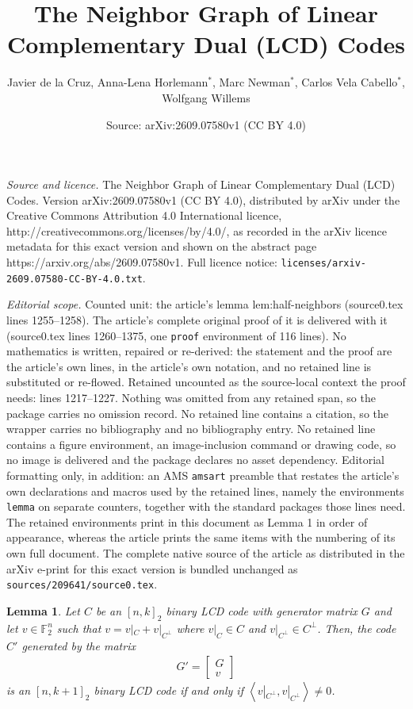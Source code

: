\documentclass[10pt,a4paper]{amsart}
\title{The Neighbor Graph of Linear Complementary Dual (LCD) Codes}
\author{Javier de la Cruz, Anna-Lena Horlemann$^*$, Marc Newman$^*$, Carlos Vela Cabello$^*$, Wolfgang Willems}
\date{Source: arXiv:2609.07580v1 (CC BY 4.0)}
\newtheorem{lemma}{Lemma}
\newcommand{\Ang}[1]{\left\langle#1\right\rangle}
\newcommand{\F}{\mathbb{F}}
\begin{document}
\maketitle

\noindent\emph{Source and licence.} The Neighbor Graph of Linear Complementary Dual (LCD) Codes. Version arXiv:2609.07580v1 (CC BY 4.0), distributed by arXiv under the Creative Commons Attribution 4.0 International licence, http://creativecommons.org/licenses/by/4.0/, as recorded in the arXiv licence metadata for this exact version and shown on the abstract page https://arxiv.org/abs/2609.07580v1. Full licence notice: \texttt{licenses/arxiv-2609.07580-CC-BY-4.0.txt}.\par\smallskip

\noindent\textit{Editorial scope.} Counted unit: the article's lemma lem:half-neighbors (source0.tex lines 1255--1258). The article's complete original proof of it is delivered with it (source0.tex lines 1260--1375, one \texttt{proof} environment of 116 lines). No mathematics is written, repaired or re-derived: the statement and the proof are the article's own lines, in the article's own notation, and no retained line is substituted or re-flowed.  Retained uncounted as the source-local context the proof needs: lines 1217--1227.  Nothing was omitted from any retained span, so the package carries no omission record.  No retained line contains a citation, so the wrapper carries no bibliography and no bibliography entry.  No retained line contains a figure environment, an image-inclusion command or drawing code, so no image is delivered and the package declares no asset dependency.  Editorial formatting only, in addition: an AMS \texttt{amsart} preamble that restates the article's own declarations and macros used by the retained lines, namely the environments \texttt{lemma} on separate counters, together with the standard packages those lines need.  The retained environments print in this document as Lemma 1 in order of appearance, whereas the article prints the same items with the numbering of its own full document.  The complete native source of the article as distributed in the arXiv e-print for this exact version is bundled unchanged as \texttt{sources/209641/source0.tex}.
\begin{lemma}\label{lem:augmented-binary}
	Let $C$ be an ${[n, k]}_2$ binary LCD code with generator matrix $G$ and let $v \in \F_2^n$ such that $v = v|_C + v|_{C^{\perp}}$ where $v|_C \in C$ and $v|_{C^{\perp}} \in C^{\perp}$.
	Then, the code $C'$ generated by the matrix
	\begin{align*}
		G' = \begin{bmatrix}
			G \\
			v
		\end{bmatrix}
	\end{align*}
	is an ${[n, k + 1]}_2$ binary LCD code if and only if $\Ang{v|_{C^{\perp}}, v|_{C^{\perp}}} \neq 0$.
\end{lemma}
\end{document}
